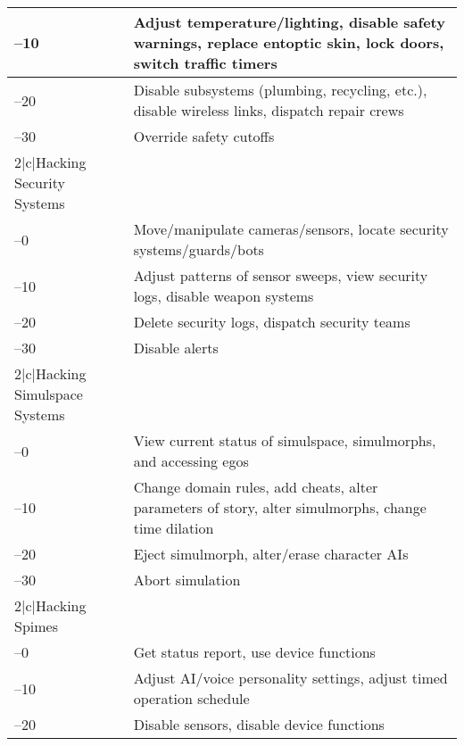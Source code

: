 \begin{table}
\begin{tabularx}{\textwidth}{|l|X|}
–10 &Adjust temperature/lighting, disable safety warnings, replace entoptic skin, lock doors, switch traffic timers \\ \hline

–20 &Disable subsystems (plumbing, recycling, etc.), disable wireless links, dispatch repair crews \\ \hline

–30 &Override safety cutoffs \\ \hline

\hline{2}{|c|}{Hacking Security Systems} \\ \hline

–0 &Move/manipulate cameras/sensors, locate security systems/guards/bots \\ \hline

–10 &Adjust patterns of sensor sweeps, view security logs, disable weapon systems \\ \hline

–20 &Delete security logs, dispatch security teams \\ \hline

–30 &Disable alerts \\ \hline

\hline{2}{|c|}{Hacking Simulspace Systems} \\ \hline

–0 &View current status of simulspace, simulmorphs, and accessing egos \\ \hline

–10 &Change domain rules, add cheats, alter parameters of story, alter simulmorphs, change time dilation \\ \hline

–20 &Eject simulmorph, alter/erase character AIs \\ \hline

–30 &Abort simulation \\ \hline

\hline{2}{|c|}{Hacking Spimes} \\ \hline

–0 &Get status report, use device functions \\ \hline

–10 &Adjust AI/voice personality settings, adjust timed operation schedule \\ \hline

–20 &Disable sensors, disable device functions \\ \hline

\end{tabularx} \end{table} 


